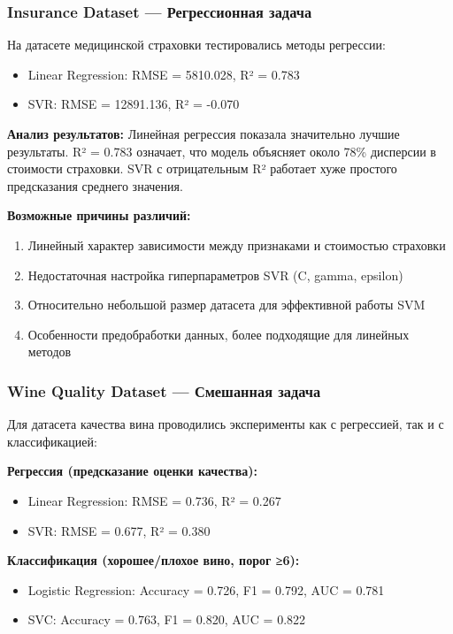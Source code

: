 \documentclass[a4paper]{article}
\begin{document}
\subsubsection{Insurance Dataset — Регрессионная задача}

На датасете медицинской страховки тестировались методы регрессии:
\begin{itemize}
    \item Linear Regression: RMSE = 5810.028, R² = 0.783
    \item SVR: RMSE = 12891.136, R² = -0.070
\end{itemize}

\textbf{Анализ результатов:}
Линейная регрессия показала значительно лучшие результаты. R² = 0.783 означает, что модель объясняет около 78\% дисперсии в стоимости страховки. SVR с отрицательным R² работает хуже простого предсказания среднего значения.

\textbf{Возможные причины различий:}
\begin{enumerate}
    \item Линейный характер зависимости между признаками и стоимостью страховки
    \item Недостаточная настройка гиперпараметров SVR (C, gamma, epsilon)
    \item Относительно небольшой размер датасета для эффективной работы SVM
    \item Особенности предобработки данных, более подходящие для линейных методов
\end{enumerate}

\subsubsection{Wine Quality Dataset — Смешанная задача}

Для датасета качества вина проводились эксперименты как с регрессией, так и с классификацией:

\textbf{Регрессия (предсказание оценки качества):}
\begin{itemize}
    \item Linear Regression: RMSE = 0.736, R² = 0.267
    \item SVR: RMSE = 0.677, R² = 0.380
\end{itemize}

\textbf{Классификация (хорошее/плохое вино, порог ≥6):}
\begin{itemize}
    \item Logistic Regression: Accuracy = 0.726, F1 = 0.792, AUC = 0.781
    \item SVC: Accuracy = 0.763, F1 = 0.820, AUC = 0.822
\end{itemize}
\end{document}
